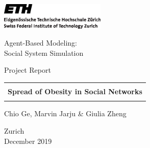 
\thispagestyle{empty}

\begin{center}
\includegraphics[width=5cm]{images/ETHlogo.eps}

\bigskip


\bigskip


\bigskip


\LARGE{ 	Agent-Based Modeling:\\ }
\LARGE{ Social System Simulation\\}

\bigskip

\bigskip

\small{Project Report}\\

\bigskip

\bigskip

\bigskip

\bigskip


\begin{tabular}{|c|}
\hline
\\
\textbf{\LARGE{Spread of Obesity in Social Networks}}\\
\\
\hline
\end{tabular}
\bigskip

\bigskip

\bigskip

\LARGE{Chio Ge, Marvin Jarju \& Giulia Zheng}



\bigskip

\bigskip

\bigskip

\bigskip

\bigskip

\bigskip

\bigskip

\bigskip

Zurich\\
December 2019\\

\end{center}


